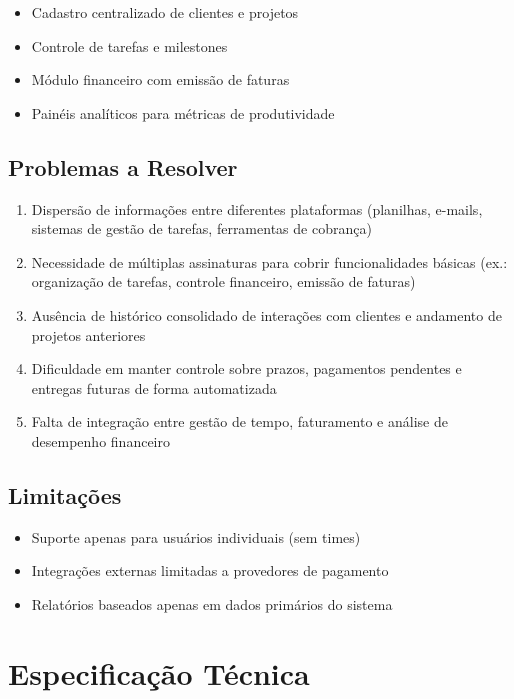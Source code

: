 \documentclass[a4paper,12pt]{article}
\begin{document}
\begin{itemize}[nosep]
  \item Cadastro centralizado de clientes e projetos
  \item Controle de tarefas e milestones
  \item Módulo financeiro com emissão de faturas
  \item Painéis analíticos para métricas de produtividade
\end{itemize}

\subsection{Problemas a Resolver}
\begin{enumerate}[nosep]
  \item Dispersão de informações entre diferentes plataformas (planilhas, e-mails, sistemas de gestão de tarefas, ferramentas de cobrança)
  \item Necessidade de múltiplas assinaturas para cobrir funcionalidades básicas (ex.: organização de tarefas, controle financeiro, emissão de faturas)
  \item Ausência de histórico consolidado de interações com clientes e andamento de projetos anteriores
  \item Dificuldade em manter controle sobre prazos, pagamentos pendentes e entregas futuras de forma automatizada
  \item Falta de integração entre gestão de tempo, faturamento e análise de desempenho financeiro
\end{enumerate}

\subsection{Limitações}
\begin{itemize}[nosep]
  \item Suporte apenas para usuários individuais (sem times)
  \item Integrações externas limitadas a provedores de pagamento
  \item Relatórios baseados apenas em dados primários do sistema
\end{itemize}

\section{Especificação Técnica}
\end{document}
